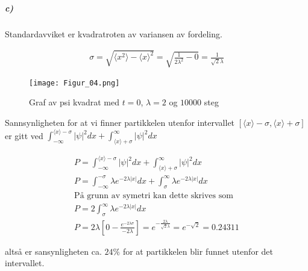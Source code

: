 \documentclass[11pt, A4paper,norsk]{article}
\begin{document}
			\subparagraph{c)}
				\begin{flushleft}
Standardavviket er kvadratroten av variansen av fordeling.
				\end{flushleft}
				\begin{gather*}
\sigma = \sqrt{\langle x^2 \rangle - \langle x \rangle^2} = \sqrt{\frac{1}{2 \lambda^{2}} - 0} = \frac{1}{\sqrt{2} \lambda}
				\end{gather*}
				\begin{figure}[H]
\texttt{[image: Figur\_04.png]}
\caption{Graf av psi kvadrat med $t = 0$, $\lambda = 2$ og $10000$ steg}
				\end{figure}
				\begin{flushleft}
Sannsynligheten for at vi finner partikkelen utenfor intervallet $[\langle x \rangle - \sigma, \langle x \rangle + \sigma]$ er gitt ved $\int_{- \infty}^{\langle x \rangle - \sigma} |\psi|^2 dx + \int_{\langle x \rangle + \sigma}^{\infty} |\psi|^2 dx$
				\end{flushleft}
				\begin{gather*}
P = \int_{- \infty}^{\langle x \rangle - \sigma} |\psi|^2 dx + \int_{\langle x \rangle + \sigma}^{\infty} |\psi|^2 dx \\
P = \int_{- \infty}^{- \sigma} \lambda e^{- 2 \lambda |x|} dx + \int_{\sigma}^{\infty} \lambda e^{- 2 \lambda |x|} dx \\
\text{På grunn av symetri kan dette skrives som} \\
P = 2 \int_{\sigma}^{\infty} \lambda e^{- 2 \lambda |x|} dx \\
P = 2 \lambda \left[0 - \frac{e^{- 2 \lambda \sigma}}{- 2 \lambda} \right] = e^{- \frac{2 \lambda}{\sqrt{2} \lambda}} = e^{-\sqrt{2}} = 0.24311
				\end{gather*}
				\begin{flushleft}
altså er sansynligheten ca. $24\%$ for at partikkelen blir funnet utenfor det intervallet.
				\end{flushleft}

\end{document}
